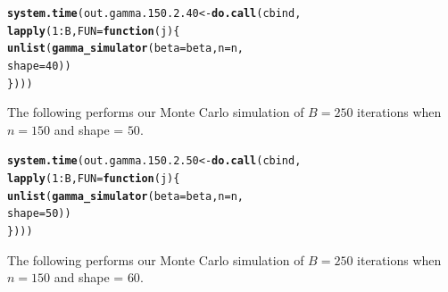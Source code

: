 \documentclass[11pt]{article}\usepackage[]{graphicx}\usepackage[]{color}
\makeatletter
\newcommand{\hlnum}[1]{\textcolor[rgb]{0.686,0.059,0.569}{#1}}%
\newcommand{\hlopt}[1]{\textcolor[rgb]{0,0,0}{#1}}%
\newcommand{\hlstd}[1]{\textcolor[rgb]{0.345,0.345,0.345}{#1}}%
\newcommand{\hlkwa}[1]{\textcolor[rgb]{0.161,0.373,0.58}{\textbf{#1}}}%
\newcommand{\hlkwb}[1]{\textcolor[rgb]{0.69,0.353,0.396}{#1}}%
\newcommand{\hlkwc}[1]{\textcolor[rgb]{0.333,0.667,0.333}{#1}}%
\newcommand{\hlkwd}[1]{\textcolor[rgb]{0.737,0.353,0.396}{\textbf{#1}}}%
\newenvironment{kframe}{%
 \def\at@end@of@kframe{}%
 \ifinner\ifhmode%
  \def\at@end@of@kframe{\end{minipage}}%
  \begin{minipage}{\columnwidth}%
 \fi\fi%
 \def\FrameCommand##1{\hskip\@totalleftmargin \hskip-\fboxsep
 \colorbox{shadecolor}{##1}\hskip-\fboxsep
     \hskip-\linewidth \hskip-\@totalleftmargin \hskip\columnwidth}%
 \MakeFramed {\advance\hsize-\width
   \@totalleftmargin\z@ \linewidth\hsize
   \@setminipage}}%
 {\par\unskip\endMakeFramed%
 \at@end@of@kframe}
\newenvironment{knitrout}{}{} %
\makeatother
\begin{document}
\begin{knitrout}
\color{fgcolor}\begin{kframe}
\begin{alltt}
\hlkwd{system.time}\hlstd{(out.gamma.150.2.40} \hlkwb{<-} \hlkwd{do.call}\hlstd{(cbind,}
  \hlkwd{lapply}\hlstd{(}\hlnum{1}\hlopt{:}\hlstd{B,} \hlkwc{FUN} \hlstd{=} \hlkwa{function}\hlstd{(}\hlkwc{j}\hlstd{)\{}
    \hlkwd{unlist}\hlstd{(}\hlkwd{gamma_simulator}\hlstd{(}\hlkwc{beta} \hlstd{= beta,} \hlkwc{n} \hlstd{= n,}
      \hlkwc{shape} \hlstd{=} \hlnum{40}\hlstd{))}
\hlstd{\})))}
\end{alltt}


{\ttfamily\noindent\bfseries\color{errorcolor}{\#\# Error in r[, l]/mad.predict.fun(out.mad, xx): non-numeric argument to binary operator}}

{\ttfamily\noindent\itshape\color{messagecolor}{\#\# Timing stopped at: 1.658 0.001 1.665}}\end{kframe}
\end{knitrout}


The following performs our Monte Carlo simulation of $B = 250$ iterations 
when $n = 150$ and shape = $50$.

\begin{knitrout}
\color{fgcolor}\begin{kframe}
\begin{alltt}
\hlkwd{system.time}\hlstd{(out.gamma.150.2.50} \hlkwb{<-} \hlkwd{do.call}\hlstd{(cbind,}
  \hlkwd{lapply}\hlstd{(}\hlnum{1}\hlopt{:}\hlstd{B,} \hlkwc{FUN} \hlstd{=} \hlkwa{function}\hlstd{(}\hlkwc{j}\hlstd{)\{}
    \hlkwd{unlist}\hlstd{(}\hlkwd{gamma_simulator}\hlstd{(}\hlkwc{beta} \hlstd{= beta,} \hlkwc{n} \hlstd{= n,}
      \hlkwc{shape} \hlstd{=} \hlnum{50}\hlstd{))}
\hlstd{\})))}
\end{alltt}


{\ttfamily\noindent\bfseries\color{errorcolor}{\#\# Error in r[, l]/mad.predict.fun(out.mad, xx): non-numeric argument to binary operator}}

{\ttfamily\noindent\itshape\color{messagecolor}{\#\# Timing stopped at: 1.809 0 1.812}}\end{kframe}
\end{knitrout}


The following performs our Monte Carlo simulation of $B = 250$ iterations 
when $n = 150$ and shape = $60$.
\end{document}
